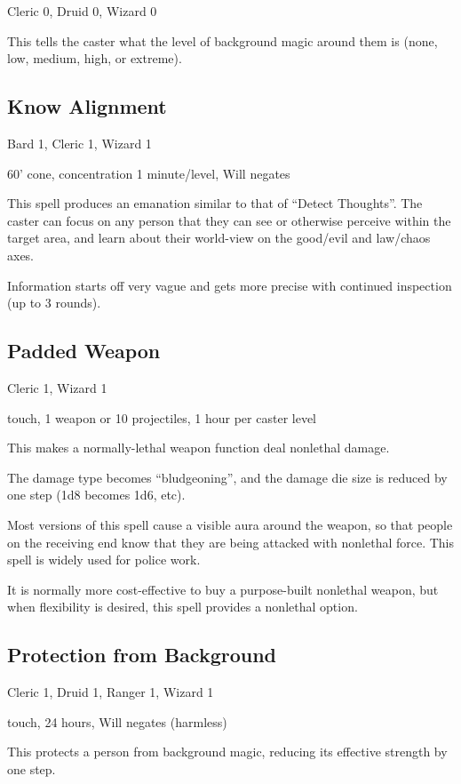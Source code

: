 Cleric 0, Druid 0, Wizard 0

This tells the caster what the level of background magic around them is
(none, low, medium, high, or extreme).
%

%
\subsection{Know Alignment}

Bard 1, Cleric 1, Wizard 1

60' cone, concentration 1 minute/level, Will negates

This spell produces an emanation similar to that of ``Detect Thoughts''.
The caster can focus on any person that they can see or otherwise perceive
within the target area, and learn about their world-view on the good/evil
and law/chaos axes.

Information starts off very vague and gets more precise with continued
inspection (up to 3 rounds).
%

%
\subsection{Padded Weapon}

Cleric 1, Wizard 1

touch, 1 weapon or 10 projectiles, 1 hour per caster level

This makes a normally-lethal weapon function deal nonlethal damage.

The damage type becomes ``bludgeoning'', and the damage die size is
reduced by one step (1d8 becomes 1d6, etc).

Most versions of this spell cause a visible aura around the weapon, so
that people on the receiving end know that they are being attacked with
nonlethal force. This spell is widely used for police work.

It is normally more cost-effective to buy a purpose-built nonlethal weapon,
but when flexibility is desired, this spell provides a nonlethal option.
%

%
\subsection{Protection from Background}

Cleric 1, Druid 1, Ranger 1, Wizard 1

touch, 24 hours, Will negates (harmless)

This protects a person from background magic, reducing its effective
strength by one step.

